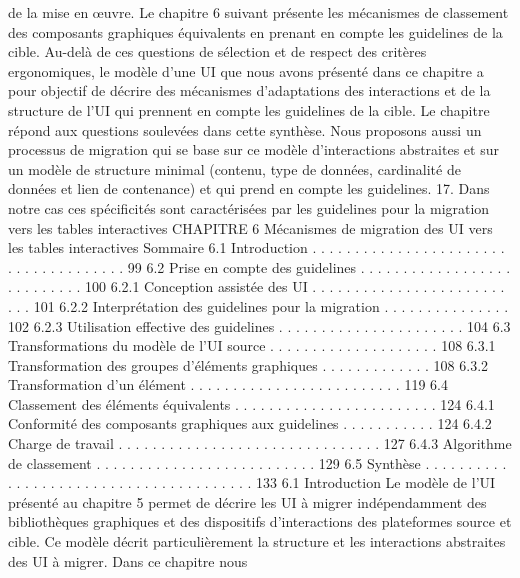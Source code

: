\documentclass{article}
\begin{document}
de la mise en œuvre. Le chapitre 6 suivant pr\'{e}sente les m\'{e}canismes de classement des composants
graphiques \'{e}quivalents en prenant en compte les guidelines de la cible.
Au-del\`{a} de ces questions de s\'{e}lection et de respect des crit\`{e}res ergonomiques, le mod\`{e}le d’une UI
que nous avons pr\'{e}sent\'{e} dans ce chapitre a pour objectif de d\'{e}crire des m\'{e}canismes d’adaptations des
interactions et de la structure de l’UI qui prennent en compte les guidelines de la cible. Le chapitre
r\'{e}pond aux questions soulev\'{e}es dans cette synth\`{e}se. Nous proposons aussi un processus de migration
qui se base sur ce mod\`{e}le d’interactions abstraites et sur un mod\`{e}le de structure minimal (contenu,
type de donn\'{e}es, cardinalit\'{e} de donn\'{e}es et lien de contenance) et qui prend en compte les guidelines.
17. Dans notre cas ces sp\'{e}ciﬁcit\'{e}s sont caract\'{e}ris\'{e}es par les guidelines pour la migration vers les tables interactives
CHAPITRE 6
M\'{e}canismes de migration des UI vers les
tables interactives
Sommaire
6.1
Introduction . . . . . . . . . . . . . . . . . . . . . . . . . . . . . . . . . . . . .
99
6.2
Prise en compte des guidelines . . . . . . . . . . . . . . . . . . . . . . . . . . . 100
6.2.1
Conception assist\'{e}e des UI . . . . . . . . . . . . . . . . . . . . . . . . . . 101
6.2.2
Interpr\'{e}tation des guidelines pour la migration
. . . . . . . . . . . . . . . 102
6.2.3
Utilisation effective des guidelines . . . . . . . . . . . . . . . . . . . . . . 104
6.3
Transformations du mod\`{e}le de l’UI source
. . . . . . . . . . . . . . . . . . . . 108
6.3.1
Transformation des groupes d’\'{e}l\'{e}ments graphiques . . . . . . . . . . . . . 108
6.3.2
Transformation d’un \'{e}l\'{e}ment . . . . . . . . . . . . . . . . . . . . . . . . . 119
6.4
Classement des \'{e}l\'{e}ments \'{e}quivalents . . . . . . . . . . . . . . . . . . . . . . . . 124
6.4.1
Conformit\'{e} des composants graphiques aux guidelines . . . . . . . . . . . 124
6.4.2
Charge de travail . . . . . . . . . . . . . . . . . . . . . . . . . . . . . . . 127
6.4.3
Algorithme de classement . . . . . . . . . . . . . . . . . . . . . . . . . . 129
6.5
Synth\`{e}se
. . . . . . . . . . . . . . . . . . . . . . . . . . . . . . . . . . . . . . . 133
6.1
Introduction
Le mod\`{e}le de l’UI pr\'{e}sent\'{e} au chapitre 5 permet de d\'{e}crire les UI \`{a} migrer ind\'{e}pendamment des
biblioth\`{e}ques graphiques et des dispositifs d’interactions des plateformes source et cible. Ce mod\`{e}le
d\'{e}crit particuli\`{e}rement la structure et les interactions abstraites des UI \`{a} migrer. Dans ce chapitre nous
\end{document}
